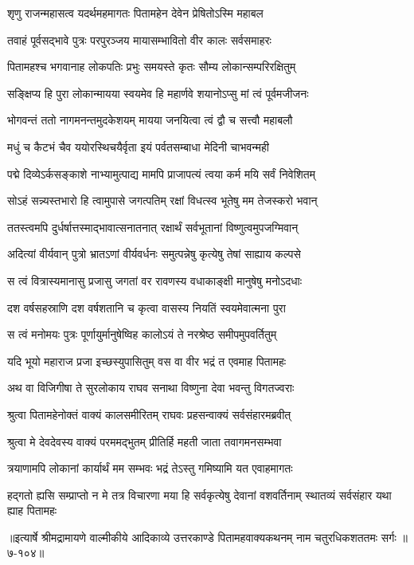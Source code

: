 
\twolineshloka
{शृणु राजन्महासत्व यदर्थमहमागतः}
{पितामहेन देवेन प्रेषितोऽस्मि महाबल} %

\twolineshloka
{तवाहं पूर्वसद्भावे पुत्रः परपुरञ्जय}
{मायासम्भावितो वीर कालः सर्वसमाहरः} %

\twolineshloka
{पितामहश्च भगवानाह लोकपतिः प्रभुः}
{समयस्ते कृतः सौम्य लोकान्सम्परिरक्षितुम्} %

\twolineshloka
{सङ्क्षिप्य हि पुरा लोकान्मायया स्वयमेव हि}
{महार्णवे शयानोऽप्सु मां त्वं पूर्वमजीजनः} %

\twolineshloka
{भोगवन्तं ततो नागमनन्तमुदकेशयम्}
{मायया जनयित्वा त्वं द्वौ च सत्त्वौ महाबलौ} %

\twolineshloka
{मधुं च कैटभं चैव ययोरस्थिचयैर्वृता}
{इयं पर्वतसम्बाधा मेदिनी चाभवन्मही} %

\twolineshloka
{पद्मे दिव्येऽर्कसङ्काशे नाभ्यामुत्पाद्य मामपि}
{प्राजापत्यं त्वया कर्म मयि सर्वं निवेशितम्} %

\twolineshloka
{सोऽहं सन्न्यस्तभारो हि त्वामुपासे जगत्पतिम्}
{रक्षां विधत्स्व भूतेषु मम तेजस्करो भवान्} %

\twolineshloka
{ततस्त्वमपि दुर्धर्षात्तस्माद्भावात्सनातनात्}
{रक्षार्थं सर्वभूतानां विष्णुत्वमुपजग्मिवान्} %

\twolineshloka
{अदित्यां वीर्यवान् पुत्रो भ्रातऽणां वीर्यवर्धनः}
{समुत्पन्नेषु कृत्येषु तेषां साह्याय कल्पसे} %

\twolineshloka
{स त्वं वित्रास्यमानासु प्रजासु जगतां वर}
{रावणस्य वधाकाङ्क्षी मानुषेषु मनोऽदधाः} %

\twolineshloka
{दश वर्षसहस्राणि दश वर्षशतानि च}
{कृत्वा वासस्य नियतिं स्वयमेवात्मना पुरा} %

\twolineshloka
{स त्वं मनोमयः पुत्रः पूर्णायुर्मानुषेष्विह}
{कालोऽयं ते नरश्रेष्ठ समीपमुपवर्तितुम्} %

\twolineshloka
{यदि भूयो महाराज प्रजा इच्छस्युपासितुम्}
{वस वा वीर भद्रं त एवमाह पितामहः} %

\twolineshloka
{अथ वा विजिगीषा ते सुरलोकाय राघव}
{सनाथा विष्णुना देवा भवन्तु विगतज्वराः} %

\twolineshloka
{श्रुत्वा पितामहेनोक्तं वाक्यं कालसमीरितम्}
{राघवः प्रहसन्वाक्यं सर्वसंहारमब्रवीत्} %

\twolineshloka
{श्रुत्वा मे देवदेवस्य वाक्यं परममद्भुतम्}
{प्रीतिर्हि महती जाता तवागमनसम्भवा} %

\twolineshloka
{त्रयाणामपि लोकानां कार्यार्थं मम सम्भवः}
{भद्रं तेऽस्तु गमिष्यामि यत एवाहमागतः} %

\threelineshloka
{हद्गतो ह्यसि सम्प्राप्तो न मे तत्र विचारणा}
{मया हि सर्वकृत्येषु देवानां वशवर्तिनाम्}
{स्थातव्यं सर्वसंहार यथा ह्याह पितामहः} %


॥इत्यार्षे श्रीमद्रामायणे वाल्मीकीये आदिकाव्ये उत्तरकाण्डे पितामहवाक्यकथनम् नाम चतुरधिकशततमः सर्गः ॥७-१०४॥

